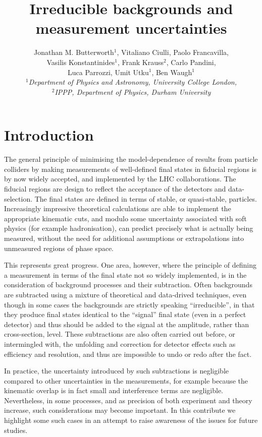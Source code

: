 \documentclass[floatfix]{article}
\title{Irreducible backgrounds and measurement uncertainties}
\author{Jonathan M. Butterworth$^1$, Vitaliano Ciulli, Paolo Francavilla,\\ Vasilis Konstantinides$^1$, Frank Krauss$^2$, Carlo Pandini,\\
Luca Parrozzi, Umit Utku$^1$, Ben Waugh$^1$ \\
\it $^1$Department of Physics and Astronomy, University College London,\\ 
\it $^2$IPPP, Department of Physics, Durham University}
\begin{document}
\maketitle 

\begin{abstract}
\end{abstract}

\section{Introduction}
\label{sec:intro}

The general principle of minimising the model-dependence of results from particle colliders by making measurements of 
well-defined final states in fiducial regions is by now widely accepted, and implemented by the LHC collaborations. 
The fiducial regions are design to reflect  the acceptance of the detectors and data-selection. 
The final states are defined in terms of stable, or quasi-stable,
particles. Increasingly impressive theoretical calculations are able to implement the appropriate kinematic cuts, and
modulo some uncertainty associated with soft physics (for example hadronisation), can predict precisely what 
is actually being measured, without the need for additional assumptions or extrapolations into unmeasured regions of 
phase space.

This represents great progress. One area, however, where the principle of defining a measurement in terms of the final state
not so widely implemented, is in the consideration of background processes and their subtraction. 
Often backgrounds are subtracted using a mixture of theoretical and data-drived techniques, 
even though in some cases the backgrounds are strictly speaking ``irreducible'', in that they produce final states 
identical to the ``signal'' final state (even in a perfect detector) and thus should be added to the signal 
at the amplitude, rather than cross-section, level. These subtractions are also often carried out before, or intermingled with, 
the unfolding and correction for detector effects such as efficiency and resolution, and thus are impossible to
undo or redo after the fact. 

In practice, the uncertainty introduced by such subtractions is negligible compared to other uncertainties in the measurements, 
for example because the kinematic overlap
is in fact small and interference terms are negligible. Nevertheless, in some processes, and as precision of both experiment
and theory increase, such considerations may become important. In this contribute we highlight some such cases in an attempt 
to raise awareness of the issues for future studies. 
\end{document}
